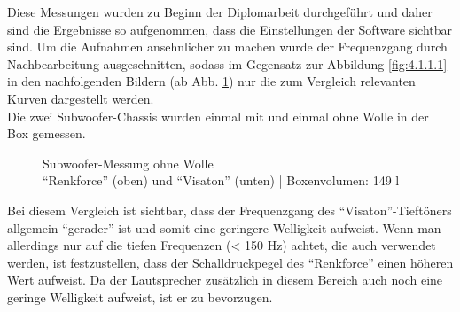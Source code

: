 \newpage
Diese Messungen wurden zu Beginn der Diplomarbeit durchgeführt und daher sind die Ergebnisse so aufgenommen, dass die Einstellungen der Software sichtbar sind. %
Um die Aufnahmen ansehnlicher zu machen wurde der Frequenzgang durch Nachbearbeitung ausgeschnitten, sodass im Gegensatz zur Abbildung \ref{fig:4.1.1.1} in den nachfolgenden Bildern (ab Abb. \ref{fig:4.2.3.2}) nur die zum Vergleich relevanten Kurven dargestellt werden.\\
Die zwei Subwoofer-Chassis wurden einmal mit und einmal ohne Wolle in der Box gemessen.
\begin{figure} [H]
	\centering
	\quad
	\caption{Subwoofer-Messung ohne Wolle\\ \enquote{Renkforce} (oben) und \enquote{Visaton} (unten) | Boxenvolumen: 149 l}
	\label{fig:4.2.3.2}
\end{figure}
Bei diesem Vergleich ist sichtbar, dass der Frequenzgang des \enquote{Visaton}-Tieftöners allgemein \enquote{gerader} ist und somit eine geringere Welligkeit aufweist.
Wenn man allerdings nur auf die tiefen Frequenzen (< 150 Hz) achtet, die auch verwendet werden, ist festzustellen, dass der Schalldruckpegel des \enquote{Renkforce} einen höheren Wert aufweist.
Da der Lautsprecher zusätzlich in diesem Bereich auch noch eine geringe Welligkeit aufweist, ist er zu bevorzugen.
\newpage
